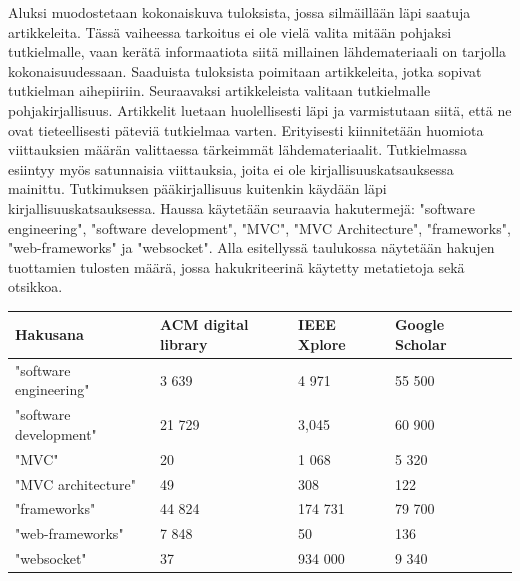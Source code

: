 \documentclass[utf8]{gradu3}
\begin{document}
Aluksi muodostetaan kokonaiskuva tuloksista, jossa silmäillään läpi
saatuja artikkeleita. Tässä vaiheessa tarkoitus ei ole vielä valita
mitään pohjaksi tutkielmalle, vaan kerätä informaatiota siitä
millainen lähdemateriaali on tarjolla kokonaisuudessaan. Saaduista 
tuloksista poimitaan artikkeleita, jotka sopivat tutkielman aihepiiriin.
Seuraavaksi artikkeleista valitaan tutkielmalle
pohjakirjallisuus. Artikkelit luetaan huolellisesti
läpi ja varmistutaan siitä, että ne ovat tieteellisesti päteviä
tutkielmaa varten. Erityisesti kiinnitetään huomiota viittauksien
määrän valittaessa tärkeimmät lähdemateriaalit. Tutkielmassa esiintyy myös satunnaisia viittauksia,
joita ei ole kirjallisuuskatsauksessa mainittu. Tutkimuksen
pääkirjallisuus kuitenkin käydään läpi kirjallisuuskatsauksessa.
Haussa käytetään seuraavia hakutermejä: "software engineering", "software development", "MVC", "MVC Architecture",
"frameworks", "web-frameworks" ja "websocket". Alla esitellyssä taulukossa näytetään hakujen tuottamien tulosten määrä, jossa hakukriteerinä käytetty
metatietoja sekä otsikkoa.


\begin{center}
\begin{tabular}[t]{|p{120pt}|p{90pt}|p{90pt}|p{90pt}|p{90pt}|}
    \hline
    Hakusana  & ACM digital library & IEEE Xplore & Google Scholar\\
    \hline
    "software engineering"   & 3 639    & 4 971 & 55 500  \\
    "software development" & 21 729  & 3,045 & 60 900 \\
    "MVC"  			 &  20	       & 1 068 & 5 320  \\
    "MVC architecture"          &  49        & 308 & 122 \\
   "frameworks" 		 &  44 824 & 174 731 & 79 700 \\
   "web-frameworks" 	 &  7 848   & 50 & 136 \\
   "websocket"                     & 37        &   934 000 &  9 340 \\
    \hline
\end{tabular}
\end{center}
\end{document}
